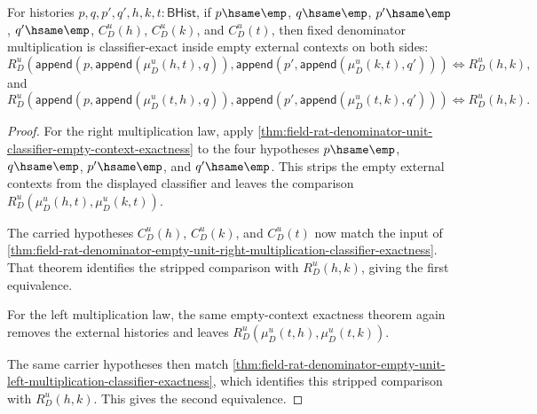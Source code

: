 \begin{theorem}
\label{thm:field-rat-denominator-empty-unit-contextual-multiplication-classifier-exactness}
For histories $p,q,p',q',h,k,t:\mathsf{BHist}$, if
$p\hsame\emp$, $q\hsame\emp$, $p'\hsame\emp$, $q'\hsame\emp$,
$C_D^u(h)$, $C_D^u(k)$, and $C_D^u(t)$, then fixed denominator
multiplication is classifier-exact inside empty external contexts on both
sides:
$$
R_D^u(\mathsf{append}(p,\mathsf{append}(\mu_D^u(h,t),q)),
\mathsf{append}(p',\mathsf{append}(\mu_D^u(k,t),q')))
\Longleftrightarrow R_D^u(h,k),
$$
and
$$
R_D^u(\mathsf{append}(p,\mathsf{append}(\mu_D^u(t,h),q)),
\mathsf{append}(p',\mathsf{append}(\mu_D^u(t,k),q')))
\Longleftrightarrow R_D^u(h,k).
$$
\end{theorem}
\begin{proof}
For the right multiplication law, apply
\autoref{thm:field-rat-denominator-unit-classifier-empty-context-exactness} to
the four hypotheses $p\hsame\emp$, $q\hsame\emp$, $p'\hsame\emp$, and
$q'\hsame\emp$. This strips the empty external contexts from the displayed
classifier and leaves the comparison
$R_D^u(\mu_D^u(h,t),\mu_D^u(k,t))$.

The carried hypotheses $C_D^u(h)$, $C_D^u(k)$, and $C_D^u(t)$ now match the
input of
\autoref{thm:field-rat-denominator-empty-unit-right-multiplication-classifier-exactness}.
That theorem identifies the stripped comparison with $R_D^u(h,k)$, giving the
first equivalence.

For the left multiplication law, the same empty-context exactness theorem
again removes the external histories and leaves
$R_D^u(\mu_D^u(t,h),\mu_D^u(t,k))$.

The same carrier hypotheses then match
\autoref{thm:field-rat-denominator-empty-unit-left-multiplication-classifier-exactness},
which identifies this stripped comparison with $R_D^u(h,k)$. This gives the
second equivalence.
\end{proof}

